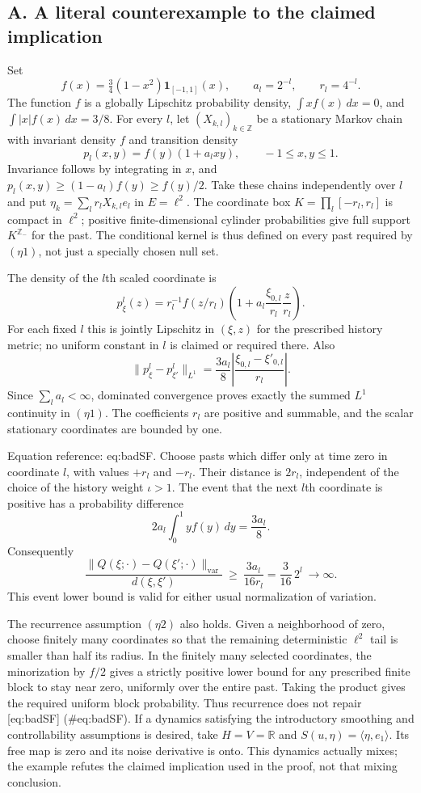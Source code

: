 \documentclass[10pt]{article}
\begin{document}
\subsection*{A. A literal counterexample to the claimed implication}
Set \[f(x)=\tfrac34(1-x^2)\mathbf1_{[-1,1]}(x),\qquad
 a_l=2^{-l},\qquad r_l=4^{-l}.\] The function \(f\) is a globally Lipschitz probability density, \(\int xf(x)\,dx=0\), and \(\int|x|f(x)\,dx=3/8\). For every \(l\), let \((X_{k,l})_{k\in\mathbb Z}\) be a stationary Markov chain with invariant density \(f\) and transition density \[p_l(x,y)=f(y)(1+a_lxy),\qquad -1\leq x,y\leq1.\] Invariance follows by integrating in \(x\), and \(p_l(x,y)\geq(1-a_l)f(y)\geq f(y)/2\). Take these chains independently over \(l\) and put \(\eta_k=\sum_l r_lX_{k,l}e_l\) in \(E=\ell^2\). The coordinate box \(K=\prod_l[-r_l,r_l]\) is compact in \(\ell^2\); positive finite-dimensional cylinder probabilities give full support \(K^{\mathbb Z_-}\) for the past. The conditional kernel is thus defined on every past required by \((\eta1)\), not just a specially chosen null set.\par
The density of the \(l\)th scaled coordinate is \[p^l_\xi(z)=r_l^{-1}f(z/r_l)
       \left(1+a_l\frac{\xi_{0,l}}{r_l}\frac z{r_l}\right).\] For each fixed \(l\) this is jointly Lipschitz in \((\xi,z)\) for the prescribed history metric; no uniform constant in \(l\) is claimed or required there. Also \[\|p^l_\xi-p^l_{\xi'}\|_{L^1}
 =\frac{3a_l}{8}
       \left|\frac{\xi_{0,l}-\xi'_{0,l}}{r_l}\right|.\] Since \(\sum_l a_l<\infty\), dominated convergence proves exactly the summed \(L^1\) continuity in \((\eta1)\). The coefficients \(r_l\) are positive and summable, and the scalar stationary coordinates are bounded by one.\par
Equation reference: eq:badSF. Choose pasts which differ only at time zero in coordinate \(l\), with values \(+r_l\) and \(-r_l\). Their distance is \(2r_l\), independent of the choice of the history weight \(\iota>1\). The event that the next \(l\)th coordinate is positive has a probability difference \[2a_l\int_0^1 yf(y)\,dy=\frac{3a_l}{8}.\] Consequently \[
 \frac{\|Q(\xi;\cdot)-Q(\xi';\cdot)\|_{\mathrm{var}}}{d(\xi,\xi')}
 \ \geq\ \frac{3a_l}{16r_l}
 =\frac3{16}\,2^l\ \longrightarrow\infty .\] This event lower bound is valid for either usual normalization of variation.\par
The recurrence assumption \((\eta2)\) also holds. Given a neighborhood of zero, choose finitely many coordinates so that the remaining deterministic \(\ell^2\) tail is smaller than half its radius. In the finitely many selected coordinates, the minorization by \(f/2\) gives a strictly positive lower bound for any prescribed finite block to stay near zero, uniformly over the entire past. Taking the product gives the required uniform block probability. Thus recurrence does not repair [eq:badSF] (\#eq:badSF). If a dynamics satisfying the introductory smoothing and controllability assumptions is desired, take \(H=V=\mathbb R\) and \(S(u,\eta)=\langle\eta,e_1\rangle\). Its free map is zero and its noise derivative is onto. This dynamics actually mixes; the example refutes the claimed implication used in the proof, not that mixing conclusion.\par
\end{document}
